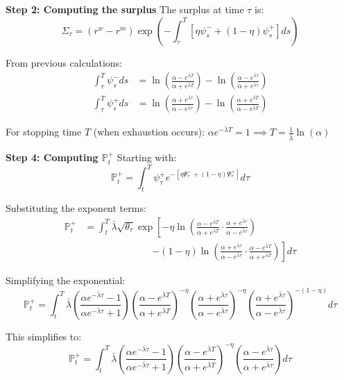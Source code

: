 \textbf{Step 2: Computing the surplus}
The surplus at time $\tau$ is:
\[
\Sigma_\tau = (r^w - r^m)\exp\left(-\int_\tau^T [\eta\psi_s^- + (1-\eta)\psi_s^+] ds\right)
\]

From previous calculations:
\begin{align}
\int_\tau^T \psi_s^- ds &= \ln\left(\frac{\alpha - e^{\bar{\lambda}T}}{\alpha + e^{\bar{\lambda}T}}\right) - \ln\left(\frac{\alpha - e^{\bar{\lambda}\tau}}{\alpha + e^{\bar{\lambda}\tau}}\right)\\
\int_\tau^T \psi_s^+ ds &= \ln\left(\frac{\alpha + e^{\bar{\lambda}\tau}}{\alpha - e^{\bar{\lambda}\tau}}\right) - \ln\left(\frac{\alpha + e^{\bar{\lambda}T}}{\alpha - e^{\bar{\lambda}T}}\right)
\end{align}

For stopping time $T$ (when exhaustion occurs): $\alpha e^{-\bar{\lambda}T} = 1 \implies T = \frac{1}{\bar{\lambda}}\ln(\alpha)$

\textbf{Step 4: Computing $\mathbb{P}_t^+$}
Starting with:
\[
\mathbb{P}_t^+ = \int_t^T \psi_\tau^+ e^{-[\eta\Psi_\tau^- + (1-\eta)\Psi_\tau^+]} d\tau
\]

Substituting the exponent terms:
\begin{align}
\mathbb{P}_t^+ &= \int_t^T \bar{\lambda}\sqrt{\theta_\tau} \exp\left[-\eta\ln\left(\frac{\alpha - e^{\bar{\lambda}T}}{\alpha + e^{\bar{\lambda}T}} \cdot \frac{\alpha + e^{\bar{\lambda}\tau}}{\alpha - e^{\bar{\lambda}\tau}}\right)\right.\\
&\qquad\qquad\qquad\quad \left.-(1-\eta)\ln\left(\frac{\alpha + e^{\bar{\lambda}\tau}}{\alpha - e^{\bar{\lambda}\tau}} \cdot \frac{\alpha - e^{\bar{\lambda}T}}{\alpha + e^{\bar{\lambda}T}}\right)\right] d\tau
\end{align}

Simplifying the exponential:
\[
\mathbb{P}_t^+ = \int_t^T \bar{\lambda}\left(\frac{\alpha e^{-\bar{\lambda}\tau} - 1}{\alpha e^{-\bar{\lambda}\tau} + 1}\right) \left(\frac{\alpha - e^{\bar{\lambda}T}}{\alpha + e^{\bar{\lambda}T}}\right)^{-\eta} \left(\frac{\alpha + e^{\bar{\lambda}\tau}}{\alpha - e^{\bar{\lambda}\tau}}\right)^{-\eta} \left(\frac{\alpha + e^{\bar{\lambda}\tau}}{\alpha - e^{\bar{\lambda}\tau}}\right)^{-(1-\eta)} d\tau
\]

This simplifies to:
\[
\mathbb{P}_t^+ = \int_t^T \bar{\lambda}\left(\frac{\alpha e^{-\bar{\lambda}\tau} - 1}{\alpha e^{-\bar{\lambda}\tau} + 1}\right) \left(\frac{\alpha - e^{\bar{\lambda}T}}{\alpha + e^{\bar{\lambda}T}}\right)^{-\eta} \left(\frac{\alpha - e^{\bar{\lambda}\tau}}{\alpha + e^{\bar{\lambda}\tau}}\right) d\tau
\]

